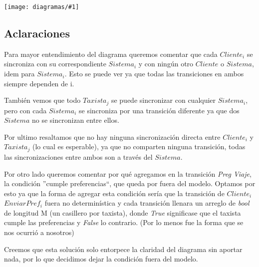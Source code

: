 \documentclass[a4paper, 10pt, twoside]{article}
\newcommand{\diagramav}[1]{%
  \texttt{[image: diagramas/\#1]}%
}
\begin{document}
\diagramav{fsm-taxi}

\subsection{Aclaraciones}

Para mayor entendimiento del diagrama queremos comentar que cada $Cliente_i$ se sincroniza con su correspondiente $Sistema_i$ y con ning\'un otro $Cliente$ o $Sistema$, idem para $Sistema_i$. Esto se puede ver ya que todas las transiciones en ambos siempre dependen de i.

Tambi\'en vemos que todo $Taxista_j$ se puede sincronizar con cualquier $Sistema_i$, pero con cada $Sistema_i$ se sincroniza por una transici\'on diferente ya que dos $Sistema$ no se sincronizan entre ellos.

Por ultimo resaltamos que no hay ninguna sincronizaci\'on directa entre $Cliente_i$ y $Taxista_j$ (lo cual es esperable), ya que no comparten ninguna transici\'on, todas las sincronizaciones entre ambos son a través del $Sistema$.

Por otro lado queremos comentar por qué agregamos en la transici\'on \emph{Preg Viaje}, la condici\'on ''cumple preferencias``, que queda por fuera del modelo. Optamos por esto ya que la forma de agregar esta condici\'on ser\'ia que la transici\'on de $Cliente_i$ $EnviarPref_i$ fuera no determin\'istica y cada transici\'on llenara un arreglo de \emph{bool} de longitud M (un casillero por taxista), donde \emph{True} significase que el taxista cumple las preferencias y \emph{False} lo contrario. (Por lo menos fue la forma que se nos ocurri\'o a nosotros) 

Creemos que esta soluci\'on solo entorpece la claridad del diagrama sin aportar nada, por lo que decidimos dejar la condici\'on fuera del modelo.






\end{document}
